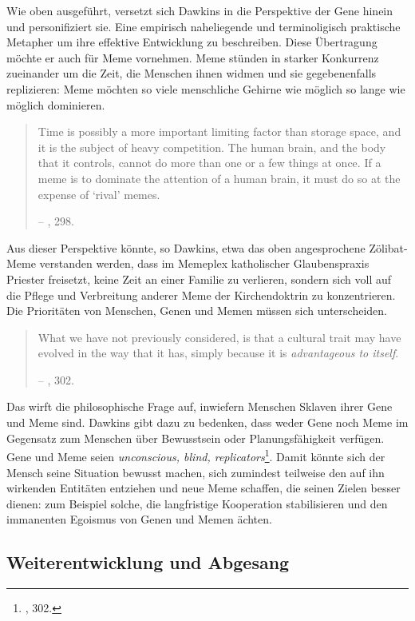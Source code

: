 \documentclass[openany,twoside,twocolumn]{book}
\let\rmarkdownfootnote\footnote%
\def\footnote{\protect\rmarkdownfootnote}
\begin{document}
Wie oben ausgeführt, versetzt sich Dawkins in die Perspektive der Gene
hinein und personifiziert sie. Eine empirisch naheliegende und
terminoligisch praktische Metapher um ihre effektive Entwicklung zu
beschreiben. Diese Übertragung möchte er auch für Meme vornehmen. Meme
stünden in starker Konkurrenz zueinander um die Zeit, die Menschen ihnen
widmen und sie gegebenenfalls replizieren: Meme möchten so viele
menschliche Gehirne wie möglich so lange wie möglich dominieren.

\begin{quote}
Time is possibly a more important limiting factor than storage space,
and it is the subject of heavy competition. The human brain, and the
body that it controls, cannot do more than one or a few things at once.
If a meme is to dominate the attention of a human brain, it must do so
at the expense of `rival' memes.

-- \textcite{Dawkinsselfishgene40th2016}, 298.
\end{quote}

Aus dieser Perspektive könnte, so Dawkins, etwa das oben angesprochene
Zölibat-Meme verstanden werden, dass im Memeplex katholischer
Glaubenspraxis Priester freisetzt, keine Zeit an einer Familie zu
verlieren, sondern sich voll auf die Pflege und Verbreitung anderer Meme
der Kirchendoktrin zu konzentrieren. Die Prioritäten von Menschen, Genen
und Memen müssen sich unterscheiden.

\begin{quote}
What we have not previously considered, is that a cultural trait may
have evolved in the way that it has, simply because it is
\emph{advantageous to itself}.

-- \textcite{Dawkinsselfishgene40th2016}, 302.
\end{quote}

Das wirft die philosophische Frage auf, inwiefern Menschen Sklaven ihrer
Gene und Meme sind. Dawkins gibt dazu zu bedenken, dass weder Gene noch
Meme im Gegensatz zum Menschen über Bewusstsein oder Planungsfähigkeit
verfügen. Gene und Meme seien \emph{unconscious, blind,
replicators}\footnote{\textcite{Dawkinsselfishgene40th2016}, 302.}.
Damit könnte sich der Mensch seine Situation bewusst machen, sich
zumindest teilweise den auf ihn wirkenden Entitäten entziehen und neue
Meme schaffen, die seinen Zielen besser dienen: zum Beispiel solche, die
langfristige Kooperation stabilisieren und den immanenten Egoismus von
Genen und Memen ächten.

\hypertarget{weiterentwicklung-und-abgesang}{%
\subsection{Weiterentwicklung und
Abgesang}\label{weiterentwicklung-und-abgesang}}
\end{document}
